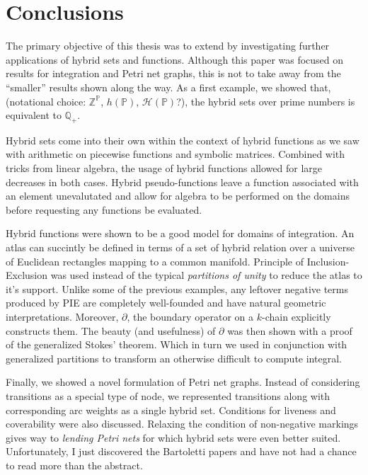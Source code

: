 \chapter{Conclusions}
\doublespacing

The primary objective of this thesis was to extend \cite{carette2010} by investigating further applications of hybrid sets and functions. 
Although this paper was focused on results for integration and Petri net graphs, this is not to take away from the ``smaller'' results shown along the way.
As a first example, we showed that, (notational choice: $\mathbb{Z}^\mathbb{P}$, $h( \mathbb{P} )$, $\mathcal{H}(\mathbb{P})$?), the hybrid sets over prime numbers is equivalent to $\mathbb{Q}_+$.



Hybrid sets come into their own within the context of hybrid functions as we saw with arithmetic on piecewise functions and symbolic matrices.
Combined with tricks from linear algebra, the usage of hybrid functions allowed for large decreases in both cases.
Hybrid pseudo-functions leave a function associated with an element unevalutated and allow for algebra to be performed on the domains before requesting any functions be evaluated.



Hybrid functions were shown to be a good model for domains of integration.
An atlas can succintly be defined in terms of a set of hybrid relation over a universe of Euclidean rectangles mapping to a common manifold.
Principle of Inclusion-Exclusion was used instead of the typical \emph{partitions of unity} to reduce the atlas to it's support.
Unlike some of the previous examples, any leftover negative terms produced by PIE are completely well-founded and have natural geometric interpretations.
Moreover, $\partial$, the boundary operator on a $k$-chain explicitly constructs them.
The beauty (and usefulness) of $\partial$ was then shown with a proof of the generalized Stokes' theorem.
Which in turn we used in conjunction with generalized partitions to transform an otherwise difficult to compute integral.



Finally, we showed a novel formulation of Petri net graphs. 
Instead of considering transitions as a special type of node, we represented transitions along with corresponding arc weights as a single hybrid set. 
Conditions for liveness and coverability were also discussed.
Relaxing the condition of non-negative markings gives way to \emph{lending Petri nets} \cite{bartolettilending} \cite{bartoletti2013} for which hybrid sets were even better suited. 
Unfortunately, I just discovered the Bartoletti papers and have not had a chance to read more than the abstract.

